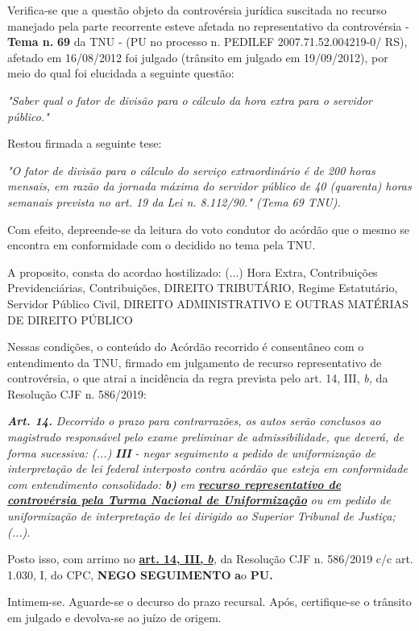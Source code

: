 \documentclass[12pt]{article}
\begin{document}
\justifying
\noindent Verifica-se que a questão objeto da controvérsia jurídica suscitada no recurso manejado pela parte recorrente esteve afetada no representativo da controvérsia - \textbf{Tema n. }\textbf{69} da TNU - (PU no processo n. PEDILEF 2007.71.52.004219-0/ RS),  afetado em 16/08/2012 foi julgado (trânsito em julgado em 19/09/2012), por meio do qual foi elucidada a seguinte questão:

\noindent \textit{"Saber qual o fator de divisão para o cálculo da hora extra para o servidor público."}

\noindent Restou firmada a seguinte tese:

\noindent \textit{"O fator de divisão para o cálculo do serviço extraordinário é de 200 horas mensais, em razão da jornada máxima do servidor público de 40 (quarenta) horas semanais prevista no art. 19 da Lei n. 8.112/90." (Tema 69 TNU).}

\noindent Com efeito, depreende-se da leitura do voto condutor do acórdão que o mesmo se encontra em conformidade com o decidido no  tema pela TNU.

\noindent A proposito, consta do acordao hostilizado: (...) Hora Extra, Contribuições Previdenciárias, Contribuições, DIREITO TRIBUTÁRIO, Regime Estatutário, Servidor Público Civil, DIREITO ADMINISTRATIVO E OUTRAS MATÉRIAS DE DIREITO PÚBLICO

\noindent Nessas condições, o conteúdo do Acórdão recorrido é consentâneo com o entendimento da TNU, firmado em julgamento de recurso representativo de controvérsia, o que atrai a incidência da regra prevista pelo art. 14, III, \textit{b,} da Resolução CJF n. 586/2019:

\noindent \textit{\textbf{Art. 14.}}\textit{ Decorrido o prazo para contrarrazões, os autos serão conclusos ao magistrado responsável pelo exame preliminar de admissibilidade, que deverá, de forma sucessiva: (...) }\textit{\textbf{III }}\textit{- negar seguimento a pedido de uniformização de interpretação de lei federal interposto contra acórdão que esteja em conformidade com entendimento consolidado: }\textit{\textbf{b)}}\textit{ em }\uline{\textit{\textbf{recurso representativo de controvérsia pela Turma Nacional de Uniformização}}}\textit{ ou em pedido de uniformização de interpretação de lei dirigido ao Superior Tribunal de Justiça;(...).}

\noindent Posto isso, com arrimo no \uline{\textbf{art. 14, III, }}\uline{\textit{\textbf{b}}}\textit{,} da Resolução CJF n. 586/2019 c/c art. 1.030, I, do CPC, \textbf{NEGO SEGUIMENTO }\textbf{a}o\textbf{ PU}\textbf{.}

\noindent Intimem-se. Aguarde-se o decurso do prazo recursal. Após, certifique-se o trânsito em julgado e devolva-se ao juízo de origem.
\end{document}
